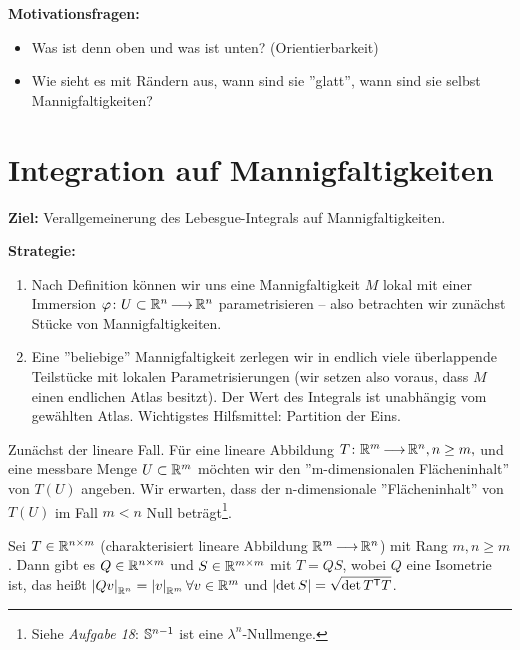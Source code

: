 \documentclass[skript.tex]{subfiles}
\begin{document}
\setcounter{chapter}{4}
\setcounter{section}{1}

\textbf{Motivationsfragen:}
\begin{itemize}
	\item Was ist denn oben und was ist unten? (Orientierbarkeit)
	\item Wie sieht es mit Rändern aus, wann sind sie ''glatt'', wann sind sie selbst Mannigfaltigkeiten?
\end{itemize}

\section{Integration auf Mannigfaltigkeiten}
\textbf{Ziel:} Verallgemeinerung des Lebesgue-Integrals auf Mannigfaltigkeiten.

\textbf{Strategie:}
\begin{enumerate}
	\item Nach Definition können wir uns eine Mannigfaltigkeit $M$ lokal mit einer Immersion $\varphi \colon U\subset{\mathbb{R}^n} \kern -1pt \longrightarrow \kern -1pt {\mathbb{R}^n}$ parametrisieren -- also betrachten wir zunächst Stücke von Mannigfaltigkeiten.
	
	\item Eine ''beliebige'' Mannigfaltigkeit zerlegen wir in endlich viele überlappende Teilstücke mit lokalen Parametrisierungen (wir setzen also voraus, dass $M$ einen endlichen Atlas besitzt). Der Wert des Integrals ist unabhängig vom gewählten Atlas. Wichtigstes Hilfsmittel: Partition der Eins.
\end{enumerate}

Zunächst der lineare Fall. Für eine lineare Abbildung $T \colon \mathbb{R}^m \kern -1pt \longrightarrow \kern -1pt {\mathbb{R}^n}, n\geq m,$ und eine messbare Menge $U\subset \mathbb{R}^m$ möchten wir den ''m-dimensionalen Flächeninhalt'' von $T(U)$ angeben. Wir erwarten, dass der n-dimensionale ''Flächeninhalt'' von $T(U)$ im Fall $m<n$ Null beträgt\footnote{Siehe \textit{Aufgabe 18}: $\mathbb{S}^{n-1}$ ist eine $\lambda^n$-Nullmenge.}.

\begin{lem}
	Sei $T\in\mathbb{R}^{n\times m}$ (charakterisiert lineare Abbildung $\mathbb{R}^m \kern -1pt \longrightarrow \kern -1pt {\mathbb{R}^n}$) mit Rang $m, n\geq m$. Dann gibt es $Q \in \mathbb{R}^{n\times m}$  und $S \in \mathbb{R}^{m\times m}$ mit $T=QS$, wobei $Q$ eine \textup{Isometrie} ist, das heißt $\left| Qv \right|_{\mathbb{R}^n} = \left| v \right|_{\mathbb{R}^m} \forall v \in \mathbb{R}^m$ und $\left| \det S \right| = \sqrt{\det T^{\mathsf{T}} T }$.
\end{lem}
\end{document}
